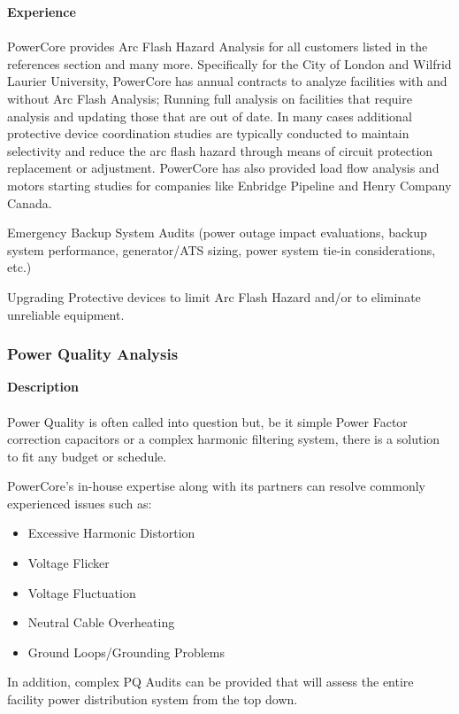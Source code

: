 \textbf{Experience}\\
\\	
PowerCore provides Arc Flash Hazard Analysis for all customers listed in the references section and many more. Specifically for the City of London and Wilfrid Laurier University, PowerCore has annual contracts to analyze facilities with and without Arc Flash Analysis; Running full analysis on facilities that require analysis and updating those that are out of date. In many cases additional protective device coordination studies are typically conducted to maintain selectivity and reduce the arc flash hazard through means of circuit protection replacement or adjustment. PowerCore has also provided load flow analysis and motors starting studies for companies like Enbridge Pipeline and Henry Company Canada.

Emergency Backup System Audits (power outage impact evaluations, backup system performance, generator/ATS sizing, power system tie-in considerations, etc.)


Upgrading Protective devices to limit Arc Flash Hazard and/or to eliminate unreliable equipment.



\subsubsection{Power Quality Analysis}
\label{Sub:Exp:PQA}

\textbf{Description}\\
\\	
Power Quality is often called into question but, be it simple Power Factor correction capacitors or a complex harmonic filtering system, there is a solution to fit any budget or schedule. 

PowerCore's in-house expertise along with its partners can resolve commonly experienced issues such as:
\begin{itemize}
	\item Excessive Harmonic Distortion
	\item Voltage Flicker
	\item Voltage Fluctuation
	\item Neutral Cable Overheating
	\item Ground Loops/Grounding Problems
\end{itemize}

In addition, complex PQ Audits can be provided that will assess the entire facility power distribution system from the top down. 

